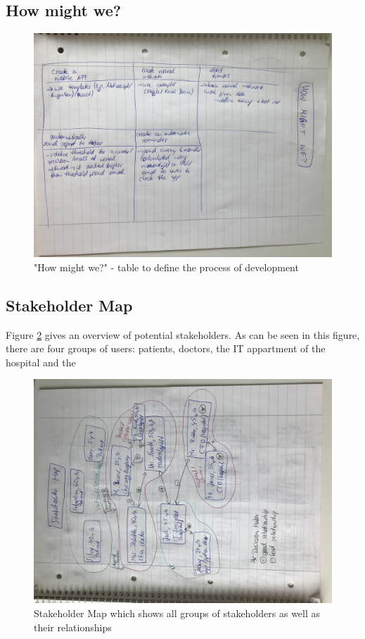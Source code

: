 \subsection{How might we?}

\begin{figure}[h!]
	\centering
	\includegraphics[width=1\textwidth]{images/howmightwe.jpg}
	\caption{"How might we?" - table to define the process of development}
	\label{howmightwe}
\end{figure}

\subsection{Stakeholder Map}

Figure \ref{stakeholdermap} gives an overview of potential stakeholders. As can be seen in this figure, there are four groups of users: patients, doctors, the IT appartment of the hospital and the 

\begin{figure}[h!]
	\centering
	\includegraphics[width=1\textwidth]{images/stakeholdermap.jpg}
	\caption{Stakeholder Map which shows all groups of stakeholders as well as their relationships}
	\label{stakeholdermap}
\end{figure}

